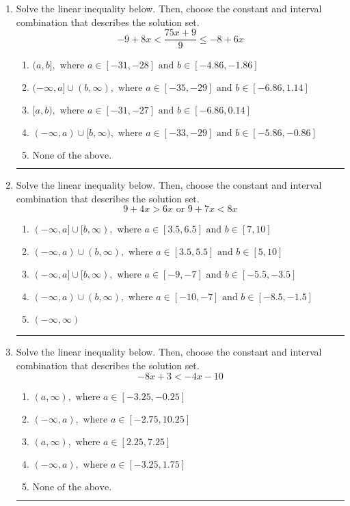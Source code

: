 \documentclass[14pt]{extbook}
\newcommand{\litem}[1]{\item#1\hspace*{-1cm}\rule{\textwidth}{0.4pt}}
\begin{document}
\begin{enumerate}
{\begin{enumerate}[label=\Alph*.]
\end{enumerate} }
\litem{
Solve the linear inequality below. Then, choose the constant and interval combination that describes the solution set.\[ -9 + 8 x < \frac{75 x + 9}{9} \leq -8 + 6 x \]\begin{enumerate}[label=\Alph*.]
\item \( (a, b], \text{ where } a \in [-31, -28] \text{ and } b \in [-4.86, -1.86] \)
\item \( (-\infty, a] \cup (b, \infty), \text{ where } a \in [-35, -29] \text{ and } b \in [-6.86, 1.14] \)
\item \( [a, b), \text{ where } a \in [-31, -27] \text{ and } b \in [-6.86, 0.14] \)
\item \( (-\infty, a) \cup [b, \infty), \text{ where } a \in [-33, -29] \text{ and } b \in [-5.86, -0.86] \)
\item \( \text{None of the above.} \)

\end{enumerate} }
\litem{
Solve the linear inequality below. Then, choose the constant and interval combination that describes the solution set.\[ 9 + 4 x > 6 x \text{ or } 9 + 7 x < 8 x \]\begin{enumerate}[label=\Alph*.]
\item \( (-\infty, a] \cup [b, \infty), \text{ where } a \in [3.5, 6.5] \text{ and } b \in [7, 10] \)
\item \( (-\infty, a) \cup (b, \infty), \text{ where } a \in [3.5, 5.5] \text{ and } b \in [5, 10] \)
\item \( (-\infty, a] \cup [b, \infty), \text{ where } a \in [-9, -7] \text{ and } b \in [-5.5, -3.5] \)
\item \( (-\infty, a) \cup (b, \infty), \text{ where } a \in [-10, -7] \text{ and } b \in [-8.5, -1.5] \)
\item \( (-\infty, \infty) \)

\end{enumerate} }
\litem{
Solve the linear inequality below. Then, choose the constant and interval combination that describes the solution set.\[ -8x + 3 < -4x -10 \]\begin{enumerate}[label=\Alph*.]
\item \( (a, \infty), \text{ where } a \in [-3.25, -0.25] \)
\item \( (-\infty, a), \text{ where } a \in [-2.75, 10.25] \)
\item \( (a, \infty), \text{ where } a \in [2.25, 7.25] \)
\item \( (-\infty, a), \text{ where } a \in [-3.25, 1.75] \)
\item \( \text{None of the above}. \)

\end{enumerate} }
\end{enumerate}
\end{document}
